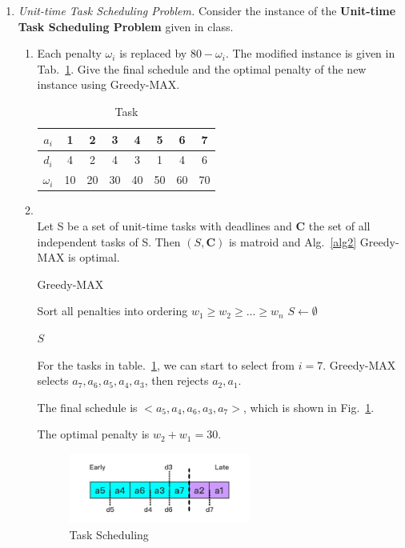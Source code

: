 \documentclass[12pt,a4paper]{article}
\makeatletter
\newtheorem*{solution}{Solution}
\theoremstyle{definition}
\renewenvironment{solution}[1][Solution] {\par\pushQED{\qed}\normalfont\topsep6\p@\@plus6\p@\relax\trivlist\item[\hskip\labelsep\bfseries#1\@addpunct{.}]\ignorespaces}{\popQED\endtrivlist\@endpefalse} \makeatother
\makeatother
\begin{document}
\begin{enumerate}
\item \textit{Unit-time Task Scheduling Problem.} Consider the instance of the \textbf{Unit-time Task Scheduling Problem} given in class. 
    \begin{enumerate}
        \item Each penalty $\omega_{i}$ is replaced by $80-\omega_{i}$. The modified instance is given in Tab.~\ref{tab:1}. Give the final schedule and the optimal penalty of the new instance using Greedy-MAX.
		\begin{table}[H]
			\setlength{\abovecaptionskip}{0.cm}
			\setlength{\belowcaptionskip}{0.5cm}
			\centering
			\caption{Task}
			\label{tab:1}			
			\begin{tabular}{|c|ccccccc|}
				\hline
				$ a_{i} $&1&2&3&4&5&6&7\\
				\hline
				$ d_{i} $&4&2&4&3&1&4&6\\
                \hline
                $ \omega_{i} $&10&20&30&40&50&60&70\\
				\hline
			\end{tabular}
		\end{table}
	        \begin{solution}
	        ~\\
	       Let S be a set of unit-time tasks with deadlines and \textbf{C} the set of all independent tasks of S. Then $(S, \mathbf{C}) $ is matroid and Alg.~\ref{alg2} Greedy-MAX is optimal.
	       
	        \begin{algorithm}[H]
   \caption{Greedy-MAX}\label{alg2}
		Sort all penalties  into ordering $w_1\geq w_2\geq ...\geq w_n$\;
		$S\leftarrow \emptyset$\;
		
		\Return $S$\;	
	\end{algorithm}
	
For the tasks in table.~\ref{tab:1}, we can start to select from $i=7$. Greedy-MAX selects $a_7, a_6, a_5,a_4,a_3$, then rejects $a_2, a_1$.

The final schedule is $<a_5, a_4, a_6,a_3,a_7>$, which is shown in Fig.~\ref{task}.

The optimal penalty is $w_2 + w_1 = 30$.


\begin{figure}[htbp]
    \centering
    \includegraphics[width=0.6\textwidth]{explain1.png}
    \caption{Task Scheduling}\label{task}
\end{figure}



\end{solution}
\end{enumerate}
\end{enumerate}
\end{document}
